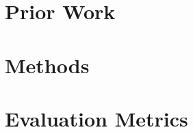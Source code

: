 \documentclass[10pt,twocolumn]{article}
\begin{document}
\begin{comment}
    Recommendation systems.
        Content based
        Collaborative filtering
        Some RS applying both / extension of work (e.g., ant colony optimization paper?)

    Supervised ML.
        Machine learning
        Supervised learning
        SVM algorithm

    Relevant NLP content
        TF-IDF
        Word embeddings
\end{comment}

\section{Prior Work}


\begin{comment}
    Products.

        Collaborative filtering - Quantic Foundry, Steam Recommender

    Papers.

        See Lit Review Google document.
    
\end{comment}

\section{Methods}


\section{Evaluation Metrics}

\end{document}
